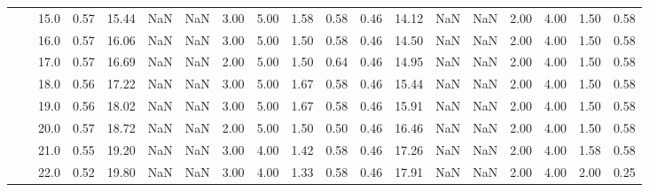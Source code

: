 \begin{tabular}{lllrrrrrrrrrrrrrrrr}
      &     & 15.0 &      0.57 &      15.44 &               NaN &                NaN & 3.00 &   5.00 &             1.58 &                         0.58 &      0.46 &      14.12 &               NaN &                NaN & 2.00 &   4.00 &             1.50 &                         0.58 \\
      &     & 16.0 &      0.57 &      16.06 &               NaN &                NaN & 3.00 &   5.00 &             1.50 &                         0.58 &      0.46 &      14.50 &               NaN &                NaN & 2.00 &   4.00 &             1.50 &                         0.58 \\
      &     & 17.0 &      0.57 &      16.69 &               NaN &                NaN & 2.00 &   5.00 &             1.50 &                         0.64 &      0.46 &      14.95 &               NaN &                NaN & 2.00 &   4.00 &             1.50 &                         0.58 \\
      &     & 18.0 &      0.56 &      17.22 &               NaN &                NaN & 3.00 &   5.00 &             1.67 &                         0.58 &      0.46 &      15.44 &               NaN &                NaN & 2.00 &   4.00 &             1.50 &                         0.58 \\
      &     & 19.0 &      0.56 &      18.02 &               NaN &                NaN & 3.00 &   5.00 &             1.67 &                         0.58 &      0.46 &      15.91 &               NaN &                NaN & 2.00 &   4.00 &             1.50 &                         0.58 \\
      &     & 20.0 &      0.57 &      18.72 &               NaN &                NaN & 2.00 &   5.00 &             1.50 &                         0.50 &      0.46 &      16.46 &               NaN &                NaN & 2.00 &   4.00 &             1.50 &                         0.58 \\
      &     & 21.0 &      0.55 &      19.20 &               NaN &                NaN & 3.00 &   4.00 &             1.42 &                         0.58 &      0.46 &      17.26 &               NaN &                NaN & 2.00 &   4.00 &             1.58 &                         0.58 \\
      &     & 22.0 &      0.52 &      19.80 &               NaN &                NaN & 3.00 &   4.00 &             1.33 &                         0.58 &      0.46 &      17.91 &               NaN &                NaN & 2.00 &   4.00 &             2.00 &                         0.25 \\

\end{tabular}
